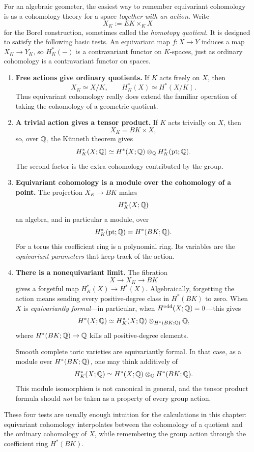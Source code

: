 \begin{agcheatsheet}
For an algebraic geometer, the easiest way to remember equivariant
cohomology is as a cohomology theory for a space \emph{together with an
action}.  Write
\[
X_K:=EK\times_KX
\]
for the Borel construction, sometimes called the \emph{homotopy
quotient}.  It is designed to satisfy the following basic tests.
An equivariant map \(f:X\to Y\) induces a map \(X_K\to Y_K\), so
\(H_K^*(-)\) is a contravariant functor on \(K\)-spaces, just as
ordinary cohomology is a contravariant functor on spaces.

\begin{enumerate}[label=\arabic*.,wide=0pt]
\item \textbf{Free actions give ordinary quotients.}
If \(K\) acts freely on \(X\), then
\[
X_K\simeq X/K,
\qquad
H_K^*(X)\simeq H^*(X/K).
\]
Thus equivariant cohomology really does extend the familiar operation
of taking the cohomology of a geometric quotient.

\item \textbf{A trivial action gives a tensor product.}
If \(K\) acts trivially on \(X\), then
\[
X_K=BK\times X,
\]
so, over \(\mathbb{Q}\), the K\"unneth theorem gives
\[
H_K^*(X;\mathbb{Q})
\simeq
H^*(X;\mathbb{Q})\otimes_{\mathbb{Q}} H_K^*(\mathrm{pt};\mathbb{Q}).
\]
The second factor is the extra cohomology contributed by the group.

\item \textbf{Equivariant cohomology is a module over the cohomology
of a point.}
The projection \(X_K\to BK\) makes
\[
H_K^*(X;\mathbb{Q})
\]
an algebra, and in particular a module, over
\[
H_K^*(\mathrm{pt};\mathbb{Q})=H^*(BK;\mathbb{Q}).
\]
For a torus this coefficient ring is a polynomial ring.  Its variables
are the \emph{equivariant parameters} that keep track of the action.

\item \textbf{There is a nonequivariant limit.}
The fibration
\[
X\longrightarrow X_K\longrightarrow BK
\]
gives a forgetful map \(H_K^*(X)\to H^*(X)\).  Algebraically, forgetting
the action means sending every positive-degree class in \(H^*(BK)\) to
zero.  When \(X\) is \emph{equivariantly formal}---in particular, when
\(H^{\mathrm{odd}}(X;\mathbb{Q})=0\)---this gives
\[
H^*(X;\mathbb{Q})
\simeq
H_K^*(X;\mathbb{Q})
\otimes_{H^*(BK;\mathbb{Q})}\mathbb{Q},
\]
where \(H^*(BK;\mathbb{Q})\to\mathbb{Q}\) kills all positive-degree elements.

Smooth complete toric varieties are equivariantly formal.  In that
case, as a module over \(H^*(BK;\mathbb{Q})\), one may think additively of
\[
H_K^*(X;\mathbb{Q})
\simeq
H^*(X;\mathbb{Q})\otimes_{\mathbb{Q}} H^*(BK;\mathbb{Q}).
\]
This module isomorphism is not canonical in general, and the tensor
product formula should \emph{not} be taken as a property of every
group action.
\end{enumerate}

These four tests are usually enough intuition for the calculations in
this chapter: equivariant cohomology interpolates between the
cohomology of a quotient and the ordinary cohomology of \(X\), while
remembering the group action through the coefficient ring \(H^*(BK)\).
\end{agcheatsheet}

